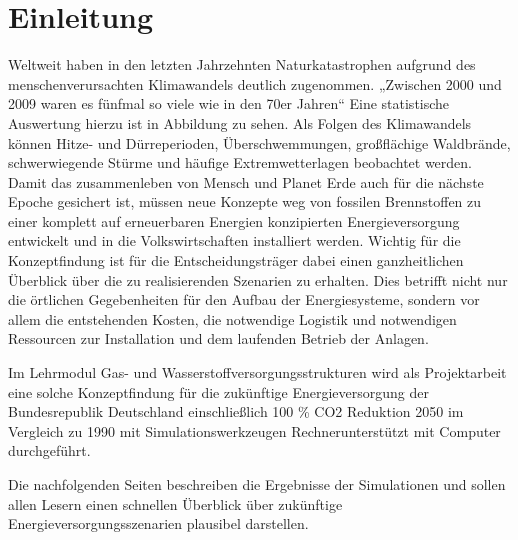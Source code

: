 \section{Einleitung}
Weltweit haben in den letzten Jahrzehnten Naturkatastrophen aufgrund des menschenverursachten Klimawandels deutlich zugenommen. „Zwischen 2000 und 2009 waren es fünfmal so viele wie in den 70er Jahren“ 
Eine statistische Auswertung hierzu ist in Abbildung  zu sehen. Als Folgen des Klimawandels können Hitze- und Dürreperioden, Überschwemmungen, großflächige Waldbrände, schwerwiegende Stürme und häufige Extremwetterlagen beobachtet werden.
Damit das zusammenleben von Mensch und Planet Erde auch für die nächste Epoche gesichert ist, müssen neue Konzepte weg von fossilen Brennstoffen zu einer komplett auf erneuerbaren Energien konzipierten Energieversorgung entwickelt und in die Volkswirtschaften installiert
werden. Wichtig für die Konzeptfindung ist für die Entscheidungsträger dabei einen ganzheitlichen Überblick über die zu realisierenden Szenarien zu erhalten. Dies betrifft nicht nur die örtlichen Gegebenheiten für den Aufbau der Energiesysteme, sondern vor allem die entstehenden Kosten, die notwendige Logistik und notwendigen Ressourcen zur Installation und dem laufenden Betrieb der Anlagen. 

Im Lehrmodul Gas- und Wasserstoffversorgungsstrukturen wird als Projektarbeit eine solche Konzeptfindung für die zukünftige Energieversorgung der Bundesrepublik Deutschland einschließlich 100 \% CO2 Reduktion 2050 im Vergleich zu 1990 mit Simulationswerkzeugen Rechnerunterstützt mit Computer durchgeführt. 

Die nachfolgenden Seiten beschreiben die Ergebnisse der Simulationen und sollen allen Lesern einen schnellen Überblick über zukünftige Energieversorgungsszenarien plausibel darstellen. 


